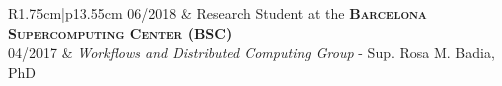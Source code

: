 \documentclass[a4paper,10pt]{article} %
\newcommand\rightColumnWidth{13.55cm}
\newcommand\leftColumnWidth{1.75cm}
\begin{document}
\begin{tabular}{R{\leftColumnWidth}|p{\rightColumnWidth}}
    \textsc{06/2018} & Research Student at the \textbf{\textsc{Barcelona Supercomputing Center} (BSC)} \\
    \textsc{04/2017} & \small{\emph{Workflows and Distributed Computing Group} - Sup. Rosa M. Badia, PhD} \\
\end{tabular}
\end{document}
